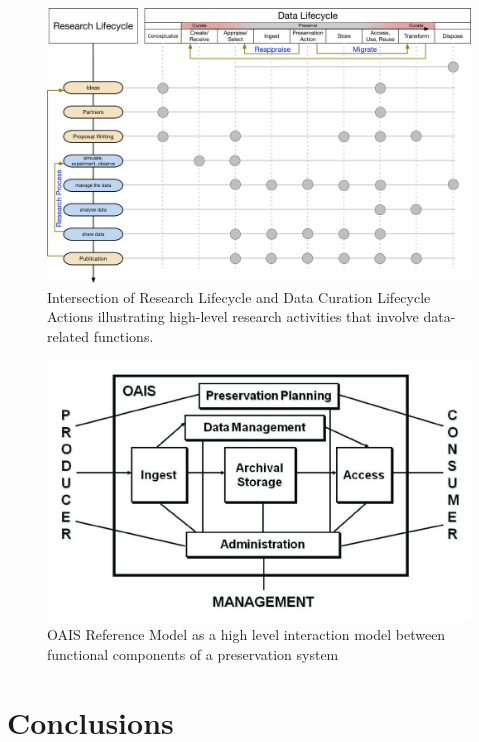 \documentclass[final]{beamer}
\begin{document}
\begin{frame}[t]
\begin{multicols}{3}
\vfill\columnbreak

\begin{figure}[htbp]
\centering
\includegraphics[width=14.00000in]{Research-DataLifecycleIntegration.png}
\caption{Intersection of Research Lifecycle \citep{_how_2014} and Data
Curation Lifecycle Actions \citep{digital_curation_centre_dcc_dcc_nd}
illustrating high-level research activities that involve data-related
functions.}
\end{figure}

\begin{figure}[htbp]
\centering
\includegraphics[width=14.00000in]{OAIS_functionalModel.png}
\caption{OAIS Reference Model
\citep{book_reference_2012, _iso_2012, oclc_open_2014} as a high level
interaction model between functional components of a preservation
system}
\end{figure}

\section{Conclusions}\label{conclusions}


\end{multicols}
\end{frame}
\end{document}
